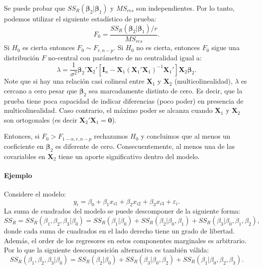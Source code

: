 \documentclass[
]{article}
\begin{document}
Se puede probar que \(SS_{R}(\boldsymbol \beta_{2}| \boldsymbol \beta_{1})\) y \(MS_{res}\) son independientes. Por lo tanto, podemos utilizar el siguiente estadístico de prueba:
\[
F_{0} = \frac{SS_{R}(\boldsymbol \beta_{2}|\boldsymbol \beta_{1})/r}{MS_{res}}.
\]
Si \(H_{0}\) es cierta entonces \(F_{0} \sim F_{r,n-p}\). Si \(H_{0}\) no es cierta, entonces \(F_{0}\) sigue una distribución \(F\) no-central con parámetro de no centralidad igual a:
\[
\lambda = \frac{1}{\sigma^{2}}\boldsymbol \beta_{2}'\boldsymbol X_{2}'\left[ \boldsymbol I_{n} - \boldsymbol X_{1}(\boldsymbol X_{1}'\boldsymbol X_{1})^{-1}\boldsymbol X_{1}'\right]\boldsymbol X_{2}\boldsymbol \beta_{2}.
\]
Note que si hay una relación casi colineal entre \(\boldsymbol X_{1}\) y \(\boldsymbol X_{2}\) (multicolinealidad), \(\lambda\) es cercano a cero pesar que \(\boldsymbol \beta_{2}\) sea marcadamente distinto de cero. Es decir, que la prueba tiene poca capacidad de indicar diferencias (poco poder) en presencia de multicolinealidad. Caso contrario, el máximo poder se alcanza cuando \(\boldsymbol X_{1}\) y \(\boldsymbol X_{2}\) son ortogonales (es decir \(\boldsymbol X_{2}'\boldsymbol X_{1} = \boldsymbol 0\)).

Entonces, si \(F_{0} > F_{1-\alpha,r,n-p}\) rechazamos \(H_{0}\) y concluimos que al menos un coeficiente en \(\boldsymbol \beta_{2}\) es diferente de cero. Consecuentemente, al menos una de las covariables en \(\boldsymbol X_{2}\) tiene un aporte significativo dentro del modelo.

\hypertarget{ejemplo}{%
\paragraph*{Ejemplo}\label{ejemplo}}

Considere el modelo:
\[
y_{i} = \beta_{0} + \beta_{1}x_{i1} + \beta_{2}x_{i2} + \beta_{3}x_{i3} + \varepsilon_{i}.
\]
La suma de cuadrados del modelo se puede descomponer de la siguiente forma:
\[
SS_{R}=SS_{R}(\beta_{1},\beta_{2},\beta_{3}| \beta_{0}) = SS_{R}(\beta_{1}|\beta_{0}) + SS_{R}(\beta_{2}|\beta_{0},\beta_{1}) + SS_{R}(\beta_{3}|\beta_{0},\beta_{1},\beta_{2}),
\]
donde cada suma de cuadrados en el lado derecho tiene un grado de libertad. Además, el order de los regresores en estos componentes marginales es arbitrario. Por lo que la siguiente descomposición alternativa es también válida:
\[
SS_{R}(\beta_{1},\beta_{2},\beta_{3}| \beta_{0})=SS_{R}(\beta_{2}|\beta_{0}) + SS_{R}(\beta_{3}|\beta_{0},\beta_{2}) + SS_{R}(\beta_{1}|\beta_{0},\beta_{2},\beta_{3}).
\]
\end{document}
